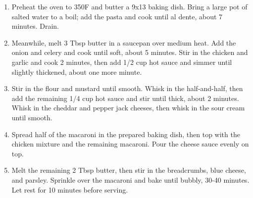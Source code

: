 \documentclass[11pt, twoside, openany]{book}
\begin{document}
\begin{minipage}[t]{\linewidth}
\vspace{-3mm}\begin{enumerate}\setlength\itemsep{-1mm}
\item Preheat the oven to 350F and butter a 9x13 baking dish. Bring a large pot of salted water to a boil; add the pasta and cook until al dente, about 7 minutes. Drain.
\item Meanwhile, melt 3 Tbsp butter in a saucepan over medium heat. Add the onion and celery and cook until soft, about 5 minutes. Stir in the chicken and garlic and cook 2 minutes, then add 1/2 cup hot sauce and simmer until slightly thickened, about one more minute.
\item Stir in the flour and mustard until smooth. Whisk in the half-and-half, then add the remaining 1/4 cup hot sauce and stir until thick, about 2 minutes. Whisk in the cheddar and pepper jack cheeses, then whisk in the sour cream until smooth.
\item Spread half of the macaroni in the prepared baking dish, then top with the chicken mixture and the remaining macaroni. Pour the cheese sauce evenly on top.
\item Melt the remaining 2 Tbsp butter, then stir in the breadcrumbs, blue cheese, and parsley. Sprinkle over the macaroni and bake until bubbly, 30-40 minutes. Let rest for 10 minutes before serving.
\end{enumerate}
\end{minipage}\vspace{8mm}
\end{document}
